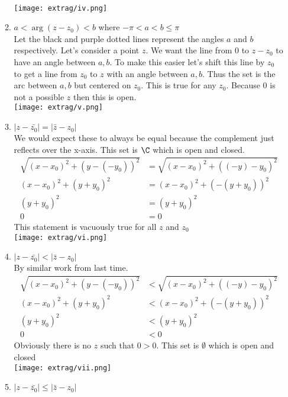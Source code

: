 \documentclass{article}
\begin{document}
\begin{enumerate}
\begin{enumerate}[label=(\roman*)]
          \\\texttt{[image: extrag/iv.png]}\\
        \item $a<\arg(z-z_0)<b$ where $-\pi<a<b\leq\pi$\\
          Let the black and purple dotted lines represent the angles $a$ and $b$ respectively. Let's consider a point $z$. We want the line from $0$ to $z-z_0$ to have an angle between $a,b$. To make this easier let's shift this line by $z_0$ to get a line from $z_0$ to $z$ with an angle between $a,b$. Thus the set is the arc between $a,b$ but centered on $z_0$. This is true for any $z_0$. Because 0 is not a possible $z$ then this is open.
          \\\texttt{[image: extrag/v.png]}
        \item $|z-\bar{z_0}|=|\bar{z}-z_0|$\\
          We would expect these to always be equal because the complement just reflects over the x-axis. This set is $\C$ which is open and closed.
          \begin{align*}
            \sqrt{(x-x_0)^2+(y-(-y_0))^2}&=\sqrt{(x-x_0)^2+((-y)-y_0)^2}\\
            (x-x_0)^2+(y+y_0)^2&=(x-x_0)^2+(-(y+y_0))^2\\
            (y+y_0)^2&=(y+y_0)^2\\
            0&=0
          \end{align*}
          This statement is vacuously true for all $z$ and $z_0$
          \\\texttt{[image: extrag/vi.png]}
        \item $|z-\bar{z_0}|<|\bar{z}-z_0|$\\
          By similar work from last time.
          \begin{align*}
            \sqrt{(x-x_0)^2+(y-(-y_0))^2}&<\sqrt{(x-x_0)^2+((-y)-y_0)^2}\\
            (x-x_0)^2+(y+y_0)^2&<(x-x_0)^2+(-(y+y_0))^2\\
            (y+y_0)^2&<(y+y_0)^2\\
            0&<0
          \end{align*}
          Obviously there is no $z$ such that $0>0$. This set is $\emptyset$ which is open and closed
          \\\texttt{[image: extrag/vii.png]}
        \item $|z-\bar{z_0}|\leq|\bar{z}-z_0|$\\

\end{enumerate}
\end{enumerate}
\end{document}
